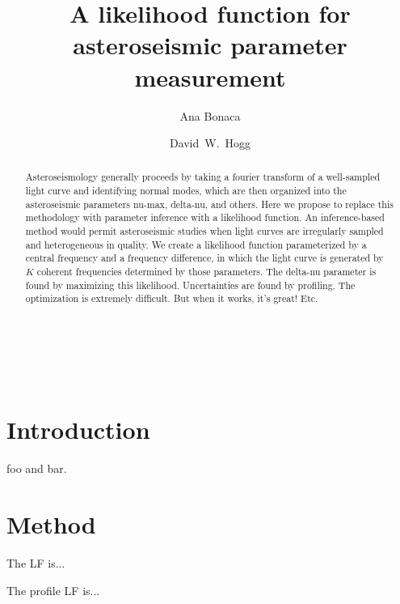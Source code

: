 \documentclass[modern]{aastex63}
\begin{document}
\title{A likelihood function for asteroseismic parameter measurement}

\author{Ana Bonaca}

\author[0000-0003-2866-9403]{David~W.~Hogg}

\begin{abstract}\noindent
Asteroseismology generally proceeds by taking a fourier transform of a
well-sampled light curve and identifying normal modes, which are then organized
into the asteroseismic parameters nu-max, delta-nu, and others.
Here we propose to replace this methodology with parameter inference with a
likelihood function.
An inference-based method would permit asteroseismic studies when light curves
are irregularly sampled and heterogeneous in quality.
We create a likelihood function parameterized by a central frequency and a
frequency difference, in which the light curve is generated by $K$ coherent
frequencies determined by those parameters.
The delta-nu parameter is found by maximizing this likelihood.
Uncertainties are found by profiling.
The optimization is extremely difficult. But when it works, it's great!
Etc.
\end{abstract}


\section*{~}\clearpage
\section{Introduction} \label{sec:intro}

foo and bar.

\section{Method}

The LF is...

The profile LF is...
\end{document}
